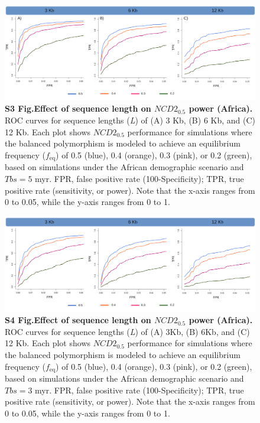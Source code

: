 \begin{refsection}
\begin{otherlanguage}{english}
\begin{figure}
\includegraphics[]{chap2_folder/supp_figures/S3_Fig.png}
\caption*{\textbf{S3 Fig.Effect of sequence length on $NCD2_{0.5}$ power (Africa). }\\
ROC curves for sequence lengths (\emph{L}) of (A) 3 Kb, (B) 6 Kb, and (C) 12 Kb. Each plot shows $NCD2_{0.5}$ performance for simulations where the balanced polymorphism is modeled to achieve an equilibrium frequency ($f_{\mathrm{eq}}$) of 0.5 (blue), 0.4 (orange), 0.3 (pink), or 0.2 (green), based on simulations under the African demographic scenario and $Tbs = 5$ myr. FPR, false positive rate (100-Specificity); TPR, true positive rate (sensitivity, or power). Note that the x-axis ranges from 0 to 0.05, while the y-axis ranges from 0 to 1.}
\end{figure}

%
%
\begin{figure}
\includegraphics[]{chap2_folder/supp_figures/S4_Fig.png}
\caption*{\textbf{S4 Fig.Effect of sequence length on $NCD2_{0.5}$ power (Africa). }\\
ROC curves for sequence lengths (\emph{L}) of (A) 3Kb, (B) 6Kb, and (C) 12 Kb. Each plot shows $NCD2_{0.5}$ performance for simulations where the balanced polymorphism is modeled to achieve an equilibrium frequency ($f_{\mathrm{eq}}$) of 0.5 (blue), 0.4 (orange), 0.3 (pink), or 0.2 (green), based on simulations under the African demographic scenario and $Tbs = 3$ myr. FPR, false positive rate (100-Specificity); TPR, true positive rate (sensitivity, or power). Note that the x-axis ranges from 0 to 0.05, while the y-axis ranges from 0 to 1.}
\end{figure}
%
%


\end{otherlanguage}
\end{refsection}
